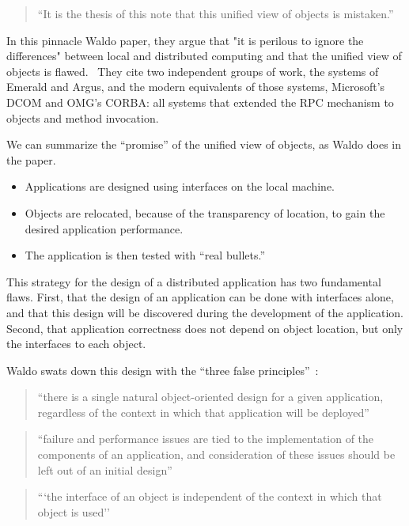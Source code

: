 \begin{quote}
``It is the thesis of this note that this unified view of objects is mistaken.''~\cite{kendall1994note}
\end{quote}

In this pinnacle Waldo paper, they argue that "it is perilous to ignore the differences" between local and distributed computing and that the unified view of objects is flawed.~\cite{kendall1994note}  They cite two independent groups of work, the systems of Emerald and Argus, and the modern equivalents of those systems, Microsoft's DCOM and OMG's CORBA: all systems that  extended the RPC mechanism to objects and method invocation.

We can summarize the ``promise'' of the unified view of objects, as Waldo does in the paper.

\begin{itemize}
\item Applications are designed using interfaces on the local machine.
\item Objects are relocated, because of the transparency of location, to gain the desired application performance.
\item The application is then tested with ``real bullets.''
\end{itemize}

This strategy for the design of a distributed application has two fundamental flaws.  First, that the design of an application can be done with interfaces alone, and that this design will be discovered during the development of the application.  Second, that application correctness does not depend on object location, but only the interfaces to each object.

Waldo swats down this design with the ``three false principles''~\cite{kendall1994note}:

\begin{quote}
``there is a single natural object-oriented design for a given
application, regardless of the context in which that application
will be deployed''
\end{quote}

\begin{quote}
``failure and performance issues are tied to the implementation of
the components of an application, and consideration of these
issues should be left out of an initial design''
\end{quote}

\begin{quote}
```the interface of an object is independent of the context in which
that object is used''
\end{quote}

